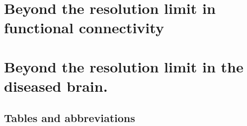\chapter{Beyond the resolution limit in functional connectivity}


\chapter{Beyond the resolution limit in the diseased brain.}

%






\begin{appendices}
\chapter{Tables and abbreviations}


\end{appendices}

%
